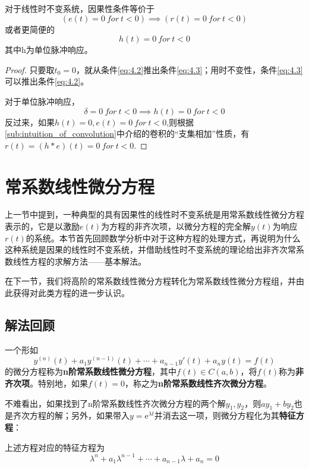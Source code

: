 \documentclass{ctexbook}
\begin{document}
\begin{proposition}
对于线性时不变系统，因果性条件等价于
\begin{equation}
    \left(e(t)=0\ for\ t<0\right)\implies \left(r(t)=0\ for\ t<0\right)\label{eq:4.3}
\end{equation}
或者更简便的
\begin{equation}
    h(t)=0\ for\ t<0\label{eq:4.4}
\end{equation}
其中h为单位脉冲响应。
\end{proposition}
\begin{proof}
只要取$t_0=0$，就从条件\ref{eq:4.2}推出条件\ref{eq:4.3}；用时不变性，条件\ref{eq:4.3}可以推出条件\ref{eq:4.2}。

对于单位脉冲响应，
$$\delta=0\ for\ t<0\implies h(t)=0\ for\ t<0$$
反过来，如果$h(t)=0,e(t)=0\ for\ t<0$,则根据\ref{sub:intuition_of_convolution}中介绍的卷积的“支集相加”性质，有$r(t)=(h*e)(t)=0\ for\ t<0$.
\end{proof}

\section{常系数线性微分方程}\label{sec:ODE}

上一节中提到，一种典型的具有因果性的线性时不变系统是用常系数线性微分方程表示的，它是以激励$e(t)$为方程的非齐次项，以微分方程的完全解$y(t)$为响应$r(t)$的系统。本节首先回顾数学分析中对于这种方程的处理方式，再说明为什么这种系统是因果的线性时不变系统，并借助线性时不变系统的理论给出非齐次常系数线性方程的求解方法——基本解法。

在下一节，我们将高阶的常系数线性微分方程转化为常系数线性微分方程组，并由此获得对此类方程的进一步认识。

\subsection{解法回顾}\label{sub:solution_of_ODE}

\begin{definition}[常系数线性微分方程]
    一个形如
    \[y^{(n)}(t)+a_{1}y^{(n-1)}(t)+\cdots +a_{n-1} y'(t)+a_n y(t)=f(t)\]
    的微分方程称为\textbf{n阶常系数线性微分方程}，其中$f(t)\in C(a,b)$，将$f(t)$称为\textbf{非齐次项}。特别地，如果$f(t)=0$，称之为\textbf{n阶常系数线性齐次微分方程}。
\end{definition}

不难看出，如果找到了n阶常系数线性齐次微分方程的两个解$y_1,y_2$，则$ay_1+by_2$也是齐次方程的解；另外，如果带入$y=\mathrm{e}^{\lambda t}$并消去这一项，则微分方程化为其\textbf{特征方程}：
\begin{definition}[特征方程]
    上述方程对应的特征方程为
    \[\lambda^n+a_{1}\lambda^{n-1}+\cdots+a_{n-1}\lambda+a_n=0\]
\end{definition}
\end{document}

